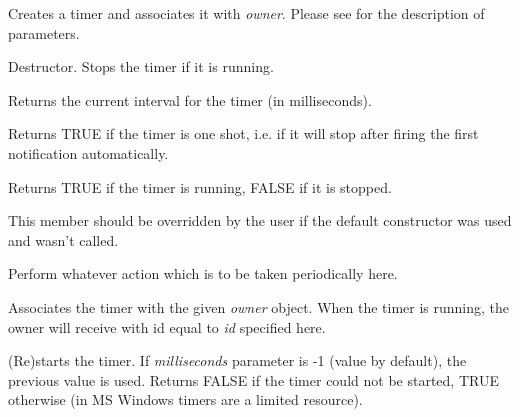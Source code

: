 Creates a timer and associates it with {\it owner}. Please see 
 for the description of parameters.



Destructor. Stops the timer if it is running.



Returns the current interval for the timer (in milliseconds).



Returns TRUE if the timer is one shot, i.e. if it will stop after firing the
first notification automatically.



Returns TRUE if the timer is running, FALSE if it is stopped.



This member should be overridden by the user if the default constructor was
used and  wasn't called.

Perform whatever action which is to be taken periodically here.



Associates the timer with the given {\it owner} object. When the timer is
running, the owner will receive  with
id equal to {\it id} specified here.



(Re)starts the timer. If {\it milliseconds} parameter is -1 (value by default),
the previous value is used. Returns FALSE if the timer could not be started,
TRUE otherwise (in MS Windows timers are a limited resource).

